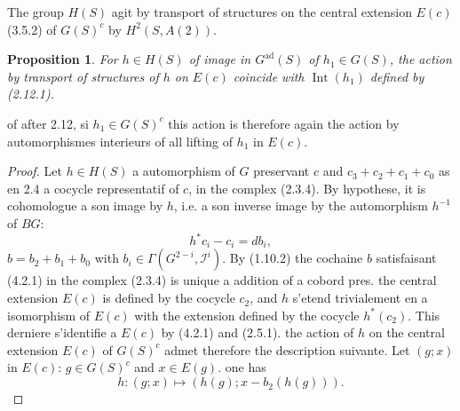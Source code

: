 \documentclass[11pt,a4paper]{article}
\theoremstyle{plain}
\newtheorem{proposition}[theorem]{Proposition}
\theoremstyle{definition}
\DeclareMathOperator{\ad}{ad}
\DeclareMathOperator{\Int}{Int}
\begin{document}
The group $H(S)$ agit by transport of structures on the central extension $E(c)$ (3.5.2) of $G(S)^c$ by $H^2(S, A(2))$.

\begin{proposition}\label{4.2}
For $h \in H(S)$ of image in $G^{\ad}(S)$ of $h_1 \in G(S)$, the action by transport of structures of $h$ on $E(c)$ coincide with $\Int(h_1)$ defined by (2.12.1).
\end{proposition}

of after 2.12, si $h_1 \in G(S)^c$ this action is therefore again the action by automorphismes interieurs of all lifting of $h_1$ in $E(c)$.

\begin{proof}
Let $h \in H(S)$ a automorphism of $G$ preservant $c$ and $c_3 + c_2 + c_1 + c_0$ as en 2.4 a cocycle representatif of $c$, in the complex (2.3.4). By hypothese, it is cohomologue a son image by $h$, i.e. a son inverse image by the automorphism $h^{-1}$ of $BG$:
\begin{equation}\label{4.2.1}
h^* c_i - c_i = db_i,
\end{equation}
$b = b_2 + b_1 + b_0$ with $b_i \in \Gamma(G^{2-i}, \mathscr{I}^i)$. By (1.10.2) the cochaine $b$ satisfaisant (4.2.1) in the complex (2.3.4) is unique a addition of a cobord pres. the central extension $E(c)$ is defined by the cocycle $c_2$, and $h$ s'etend trivialement en a isomorphism of $E(c)$ with the extension defined by the cocycle $h^*(c_2)$. This derniere s'identifie a $E(c)$ by (4.2.1) and (2.5.1). the action of $h$ on the central extension $E(c)$ of $G(S)^c$ admet therefore the description suivante. Let $(g; x)$ in $E(c)$: $g \in G(S)^c$ and $x \in E(g)$. one has
\begin{equation}\label{4.2.2}
h : (g; x) \mapsto (h(g); x - b_2(h(g))).
\end{equation}


\end{proof}
\end{document}
